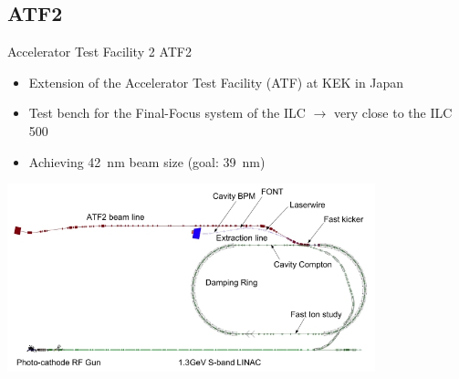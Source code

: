 \documentclass[xcolor={dvipsnames}]{beamer}
\begin{document}
\subsection{ATF2}
\begin{frame}{Accelerator Test Facility 2}
ATF2
\begin{itemize}
\item Extension of the Accelerator Test Facility (ATF) at KEK in Japan
\item Test bench for the Final-Focus system of the ILC $\rightarrow$ very close to the ILC 500
\item Achieving \SI{42}{\nano\metre} beam size (goal: \SI{39}{\nano\metre})
\end{itemize}
\vspace*{0.3cm}
\begin{center}
 	\includegraphics[width=0.8\textwidth]{figures/ATF.jpg}
\end{center}

\end{frame}
\end{document}
